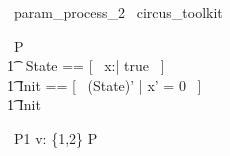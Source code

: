
\begin{zsection}
  \SECTION\ param\_process\_2 \parents\ circus\_toolkit
\end{zsection}

\begin{circus}
    \circprocess\ P \circdef  \circbegin  \\
    	\t1 \circstate\ State == [~ x:\nat | true ~] \\
    	\t1	Init == [~ (State)' | x' = 0 ~] \\
        \t1 \circspot \lschexpract Init \rschexpract \circseq \Skip \\
    \circend
\end{circus}

\begin{circus}
    \circprocess\ P1 \circdef  v: \{1,2\} \circspot P \\
\end{circus}
